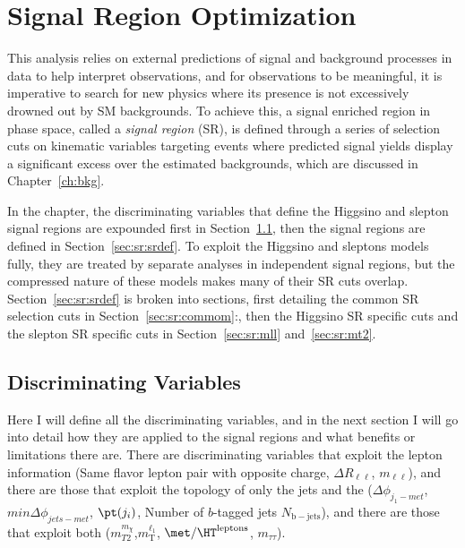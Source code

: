 \chapter{Signal Region Optimization}
 \label{ch:sr}
This analysis relies on external predictions of signal and background processes in data to help interpret observations, and for observations to be meaningful, it is imperative to search for new physics where its presence is not excessively drowned out by SM backgrounds.  To achieve this, a signal enriched region in phase space, called a \textit{signal region} (SR), is defined through a series of selection cuts on kinematic variables targeting events where predicted signal yields display a significant excess over the estimated backgrounds, which are discussed in Chapter~\ref{ch:bkg}.   
 
 In the chapter, the discriminating variables that define the Higgsino and slepton signal regions are expounded first in Section~\ref{sec:sr:discvar}, then the signal regions are defined in Section~\ref{sec:sr:srdef}.  To exploit the Higgsino and sleptons models fully, they are treated by separate analyses in independent signal regions, but the compressed nature of these models makes many of their SR cuts overlap.  Section~\ref{sec:sr:srdef} is broken into sections, first detailing the common SR selection cuts in Section~\ref{sec:sr:commom}:, then the Higgsino SR specific cuts and the slepton SR specific cuts in Section~\ref{sec:sr:mll} and~\ref{sec:sr:mt2}. 
 
\section{Discriminating Variables}
\label{sec:sr:discvar}
Here I will define all the discriminating variables, and in the next section I will go into detail how they are applied to the signal regions and what benefits or limitations there are.  There are discriminating variables that exploit the lepton information (Same flavor lepton pair with opposite charge, $\Delta R_{\ell\ell}$, $m_{\ell\ell}$), and there are those that exploit the topology of only the jets and the \met{} ($\Delta\phi_{ j_1-met}$, $min \Delta\phi_{jets-met}$, $\pt(j_i)$, Number of $b$-tagged jets $N_\mathrm{b-jets}$), and there are those that exploit both ($m_{T2}^{m_{\chi}}$,$m_\text{T}^{\ell_1}$, $\met/\HT^\text{leptons}$, $m_{\tau\tau}$).  

